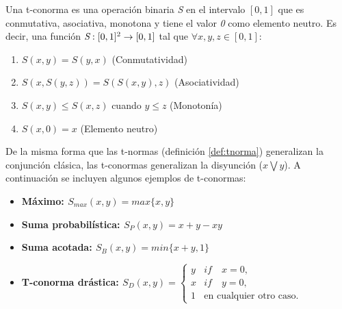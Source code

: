 \begin{definition}
Una t-conorma es una operación binaria \emph{S} en el intervalo $[0,1]$ que es conmutativa, asociativa, monotona y tiene el valor \emph{0} como elemento neutro. Es decir, una función $\emph{S} : [0,1]^2 \rightarrow [0,1]$ tal que $\forall x,y,z \in [0,1]$:
\begin{enumerate}[label=(S\arabic*),ref=(S\arabic*)]
   \item $S(x,y) = S(y,x)$ (Conmutatividad)\label{S1}
   \item $S(x,S(y,z)) = S(S(x,y),z)$ (Asociatividad)\label{S2}
   \item $S(x,y) \leq S(x,z)$ cuando $y \leq z$ (Monotonía)\label{S3}
   \item $S(x,0) = x$ (Elemento neutro)\label{S4}
  \end{enumerate}
\end{definition}
De la misma forma que las t-normas (definición \ref{def:tnorma}) generalizan la conjunción clásica, las t-conormas generalizan la disyunción ($x\bigvee y$). A continuación se incluyen algunos ejemplos de t-conormas:
\begin{itemize}
	\item \bfseries Máximo: $S_{max}(x,y) = max\{x,y\}$
	\item \bfseries Suma probabilística: $S_{P}(x,y) = x + y - xy$
	\item \bfseries Suma acotada: $S_{B}(x,y) = min\{x+y,1\}$
	\item \bfseries T-conorma drástica: \mdseries $S_{D}(x,y) = \begin{cases} y & if\quad x=0, \\ x & if\quad y=0, \\1 & \text{en cualquier otro caso}. \end{cases}$
\end{itemize}
